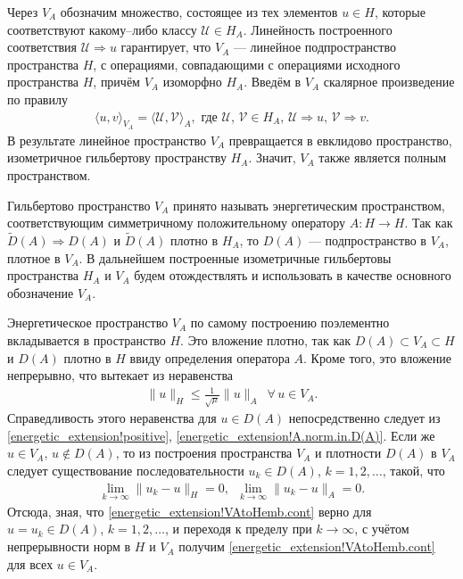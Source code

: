 \documentclass{report}
\begin{document}
Через $V_A$ обозначим множество, состоящее из тех элементов $u\in H$, которые соответствуют какому--либо классу $\mathcal{U}\in H_A$. Линейность построенного соответствия
$\mathcal{U}\Rightarrow u$ гарантирует, что $V_A$ --- линейное подпространство пространства $H$, с операциями, совпадающими с операциями исходного пространства $H$, причём $V_A$
изоморфно $H_A$. Введём в $V_A$ скалярное произведение по правилу
\begin{gather*}
\langle u,v\rangle_{V_A}=\langle\mathcal{U},\mathcal{V}\rangle_A,\text{ где  $\mathcal{U}$, $\mathcal{V}\in H_A$, $\mathcal{U}\Rightarrow u$, $\mathcal{V}\Rightarrow v$}.
\end{gather*}
В результате линейное пространство $V_A$ превращается в евклидово пространство, изометричное гильбертову пространству $H_A$. Значит, $V_A$ также является полным пространством.

Гильбертово пространство $V_A$ принято называть энергетическим пространством, соответствующим симметричному положительному оператору $A:H\to H$. Так как $\tilde{D}(A)\Rightarrow D(A)$ и
$\tilde{D}(A)$ плотно в $H_A$, то $D(A)$ --- подпространство в $V_A$, плотное в $V_A$. В дальнейшем построенные изометричные гильбертовы пространства $H_A$ и $V_A$ будем отождествлять и
использовать в качестве основного обозначение $V_A$.

Энергетическое пространство $V_A$ по самому построению поэлементно вкладывается в пространство $H$. Это вложение плотно, так как $D(A)\subset V_A\subset H$ и $D(A)$ плотно в $H$ ввиду
определения оператора $A$. Кроме того, это вложение непрерывно, что вытекает из неравенства
\begin{gather}\label{energetic_extension!VAtoHemb.cont}
\|u\|_H\leqslant\frac1{\sqrt\mu}\|u\|_A\,\,\,\forall\,u\in V_A.
\end{gather}
Справедливость этого неравенства для $u\in D(A)$ непосредственно следует из \eqref{energetic_extension!positive}, \eqref{energetic_extension!A.norm.in.D(A)}. Если же $u\in V_A$, $u\not\in
D(A)$, то из построения пространства $V_A$ и плотности $D(A)$ в $V_A$ следует существование последовательности $u_k\in D(A)$, $k=1,2,\dots$, такой, что
\begin{gather*}
\lim\limits_{k\to\infty}\|u_k-u\|_H=0,\,\,\,\lim\limits_{k\to\infty}\|u_k-u\|_A=0.
\end{gather*}
Отсюда, зная, что \eqref{energetic_extension!VAtoHemb.cont} верно для $u=u_k\in D(A)$, $k=1,2,\dots$, и переходя к пределу при $k\to\infty$, с учётом непрерывности норм в $H$ и $V_A$
получим \eqref{energetic_extension!VAtoHemb.cont} для всех $u\in V_A$.
\end{document}
